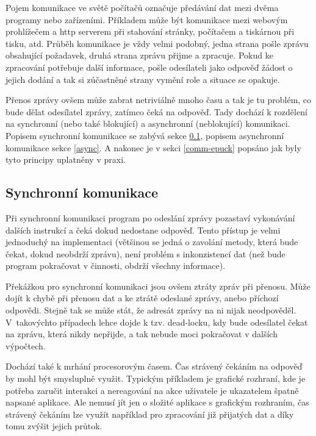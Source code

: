     Pojem komunikace ve světě počítačů označuje předávání dat mezi dvěma
    programy nebo zařízeními. Příkladem může být komunikace mezi webovým
    prohlížečem a http serverem při stahování stránky, počítačem a tiskárnou
    při tisku, atd. Průběh komunikace je vždy velmi podobný, jedna strana pošle
    zprávu obsahující požadavek, druhá strana zprávu přijme a zpracuje. Pokud
    ke zpracování potřebuje další informace, pošle odesílateli jako odpověď
    žádost o jejich dodání a tak si zúčastněné strany vymění role a situace se
    opakuje.

    Přenos zprávy ovšem může zabrat netriviálně mnoho času a tak je tu problém,
    co bude dělat odesílatel zprávy, zatímco čeká na odpověď. Tady dochází k
    rozdělení na synchronní (nebo také blokující) a asynchronní (neblokující)
    komunikaci. Popisem synchronní komunikace se zabývá sekce \ref{sync},
    popisem asynchronní komunikace sekce \ref{async}. A nakonec je v sekci
    \ref{comm-epuck} popsáno jak byly tyto principy uplatněny v praxi.

    \subsection{Synchronní komunikace}
    \label{sync}

    Při synchronní komunikaci program po odeslání zprávy pozastaví vykonávání
    dalších instrukcí a čeká dokud nedostane odpověď. Tento přístup je velmi
    jednoduchý na implementaci (většinou se jedná o zavolání metody, která bude
    čekat, dokud neobdrží zprávu), není problém s inkonzistencí dat (než bude
    program pokračovat v činnosti, obdrží všechny informace).

    Překážkou pro synchronní komunikaci jsou ovšem ztráty zpráv při přenosu.
    Může dojít k chybě při přenosu dat a ke ztrátě odeslané zprávy, anebo
    příchozí odpovědi. Stejně tak se může stát, že adresát zprávy na ni nijak
    neodpověděl. V~takovýchto případech lehce dojde k tzv. dead-locku, kdy bude
    odesílatel čekat na zprávu, která nikdy nepřijde, a tak nebude moci
    pokračovat v dalších výpočtech.

    Dochází také k mrhání procesorovým časem. Čas strávený čekáním na odpověď
    by mohl být smysluplně využit. Typickým příkladem je grafické rozhraní, kde
    je potřeba zaručit interakci a nereagování na akce uživatele je ukazatelem
    špatně napsané aplikace. Ale nemusí jít jen o složité aplikace s grafickým
    rozhraním, čas strávený čekáním lze využít například pro zpracování
    již přijatých dat a díky tomu zvýšit jejich průtok.

